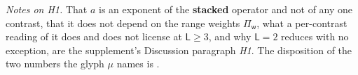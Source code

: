 \noindent\emph{Notes on H1.} That $a$ is an exponent of the \textbf{stacked} operator and not of any one
contrast, that it does not depend on the range weights $\Pi_{\mathsf w}$, what a per-contrast reading of
it does and does not license at $\mathsf L\ge3$, and why $\mathsf L=2$ reduces with no exception, are the
supplement's Discussion paragraph \emph{H1}. The disposition of the two numbers the glyph $\mu$ names is
.

%

